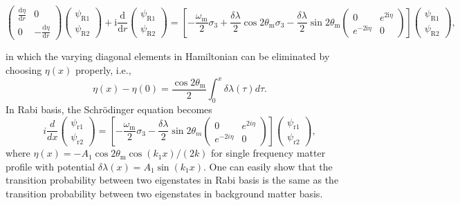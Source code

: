 \documentclass[%
reprint,
 amsmath,amssymb,
 aps,
]{revtex4-1}
\begin{document}
\begin{widetext}
\begin{equation*}
    \begin{pmatrix}  \frac{\mathrm d\eta}{\mathrm dr}  & 0 \\ 0 & - \frac{\mathrm d\eta}{\mathrm d r}  \end{pmatrix} \begin{pmatrix} \psi_{\mathrm R1} \\ \psi_{\mathrm R2} \end{pmatrix} + \mathrm i \frac{\mathrm d}{\mathrm dr} \begin{pmatrix} \psi_{\mathrm R1} \\ \psi_{\mathrm R2} \end{pmatrix} 
    =
\left[ -\frac{\omega_{\mathrm m} }{2} \sigma_3  + \frac{\delta \lambda}{2} \cos 2\theta_{\mathrm m}  \sigma_3  - \frac{\delta \lambda}{2} \sin 2\theta_{\mathrm m} \begin{pmatrix} 0 & e^{2\mathrm i\eta} \\ e^{-2 \mathrm i\eta } & 0 \end{pmatrix}   \right] \begin{pmatrix} \psi_{\mathrm R1} \\ \psi_{\mathrm R2} \end{pmatrix},
\end{equation*}
\end{widetext}
in which the varying diagonal elements in Hamiltonian can be eliminated by choosing $\eta(x)$ properly, i.e.,
\begin{equation}
    \eta(x) - \eta(0) =  \frac{\cos 2\theta_{\mathrm{m}}}{2} \int_0^x \delta\lambda (\tau) d\tau.
\end{equation}
In Rabi basis, the Schr\"{o}dinger equation becomes
\begin{equation*}
    i \frac{d}{dx} \begin{pmatrix} \psi_{\mathrm r1} \\ \psi_{\mathrm r2} \end{pmatrix} = \left[ - \frac{\omega_{\mathrm m}}{2} \sigma_3 - \frac{\delta \lambda}{2} \sin 2\theta_m \begin{pmatrix} 0 & e^{2i\eta} \\ e^{-2 i\eta } & 0 \end{pmatrix}\right] \begin{pmatrix} \psi_{\mathrm r1} \\ \psi_{\mathrm r2} \end{pmatrix},
\end{equation*}
where $\eta(x) = - A_1 \cos 2\theta_{\mathrm m} \cos (k_1 x)/(2 k) $ for single frequency matter profile with potential $\delta\lambda(x) = A_1\sin(k_1x)$.  One can easily show that the transition probability between two eigenstates in Rabi basis is the same as the transition probability between two eigenstates in background matter basis.
\end{document}

